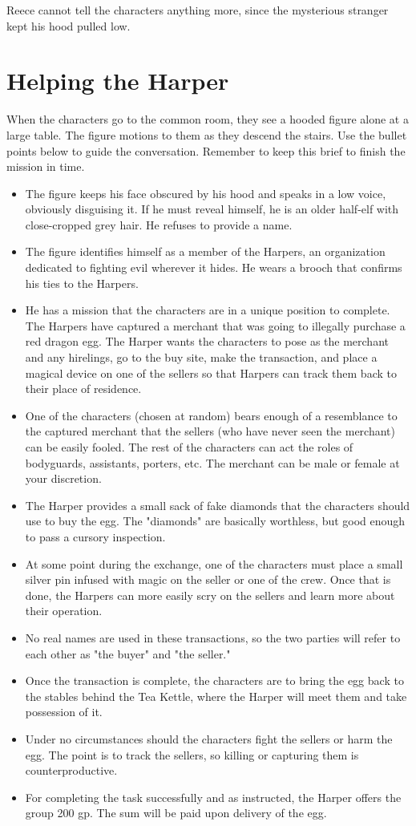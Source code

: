 \documentclass[10pt,a4paper,twoside,bg=print,twocolumn,openany,nodeprecatedcode]{dndbook}
\begin{document}
Reece cannot tell the characters anything more, since the mysterious stranger kept his hood pulled low.

\section{Helping the Harper}
When the characters go to the common room, they see a hooded figure alone at a large table. The figure motions to them as they descend the stairs. Use the bullet points below to guide the conversation. Remember to keep this brief to finish the mission in time.


\begin{itemize}
\item The figure keeps his face obscured by his hood and speaks in a low voice, obviously disguising it. If he must reveal himself, he is an older half-elf with close-cropped grey hair. He refuses to provide a name.
\item The figure identifies himself as a member of the Harpers, an organization dedicated to fighting evil wherever it hides. He wears a brooch that confirms his ties to the Harpers.
\item He has a mission that the characters are in a unique position to complete. The Harpers have captured a merchant that was going to illegally purchase a red dragon egg. The Harper wants the characters to pose as the merchant and any hirelings, go to the buy site, make the transaction, and place a magical device on one of the sellers so that Harpers can track them back to their place of residence.
\item One of the characters (chosen at random) bears enough of a resemblance to the captured merchant that the sellers (who have never seen the merchant) can be easily fooled. The rest of the characters can act the roles of bodyguards, assistants, porters, etc. The merchant can be male or female at your discretion.
\item The Harper provides a small sack of fake diamonds that the characters should use to buy the egg. The "diamonds" are basically worthless, but good enough to pass a cursory inspection.
\item At some point during the exchange, one of the characters must place a small silver pin infused with magic on the seller or one of the crew. Once that is done, the Harpers can more easily scry on the sellers and learn more about their operation.
\item No real names are used in these transactions, so the two parties will refer to each other as "the buyer" and "the seller."
\item Once the transaction is complete, the characters are to bring the egg back to the stables behind the Tea Kettle, where the Harper will meet them and take possession of it.
\item Under no circumstances should the characters fight the sellers or harm the egg. The point is to track the sellers, so killing or capturing them is counterproductive.
\item For completing the task successfully and as instructed, the Harper offers the group 200 gp. The sum will be paid upon delivery of the egg.
\end{itemize}
\end{document}
